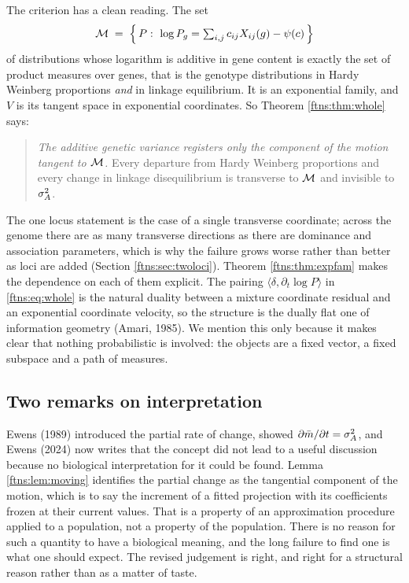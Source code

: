 The criterion has a clean reading. The set
\[
\mathcal{M}\;=\;\Big\{\,P:\ \log P_g=\textstyle\sum_{i,j}c_{ij}X_{ij}(g)-\psi(c)\,\Big\}
\]
of distributions whose logarithm is additive in gene content is exactly the set of product measures
over genes, that is the genotype distributions in Hardy Weinberg proportions \emph{and} in linkage
equilibrium. It is an exponential family, and $V$ is its tangent space in exponential coordinates.
So Theorem \ref{ftns:thm:whole} says:

\begin{quote}
\emph{The additive genetic variance registers only the component of the motion tangent to
$\mathcal{M}$.} Every departure from Hardy Weinberg proportions and every change in linkage
disequilibrium is transverse to $\mathcal{M}$ and invisible to $\sigma^{2}_{A}$.
\end{quote}

The one locus statement is the case of a single transverse coordinate; across the genome there are
as many transverse directions as there are dominance and association parameters, which is why the
failure grows worse rather than better as loci are added (Section \ref{ftns:sec:twoloci}).
Theorem \ref{ftns:thm:expfam} makes the dependence on each of them explicit. The pairing
$\langle\delta,\partial_t\log P\rangle$ in \eqref{ftns:eq:whole} is the natural duality between a
mixture coordinate residual and an exponential coordinate velocity, so the structure is the dually
flat one of information geometry (Amari, 1985). We mention this only because it makes clear that
nothing probabilistic is involved: the objects are a fixed vector, a fixed subspace and a path of
measures.

\subsection{Two remarks on interpretation}

\begin{remark}
\label{ftns:rem:partial}
Ewens (1989) introduced the partial rate of change, showed $\partial\bar{m}/\partial t=\sigma^{2}_{A}$, and
Ewens (2024) now writes that the concept did not lead to a useful discussion because no biological
interpretation for it could be found. Lemma \ref{ftns:lem:moving} identifies the partial change as the
tangential component of the motion, which is to say the increment of a fitted projection with its
coefficients frozen at their current values. That is a property of an approximation procedure
applied to a population, not a property of the population. There is no reason for such a quantity
to have a biological meaning, and the long failure to find one is what one should expect. The
revised judgement is right, and right for a structural reason rather than as a matter of taste.
\end{remark}

